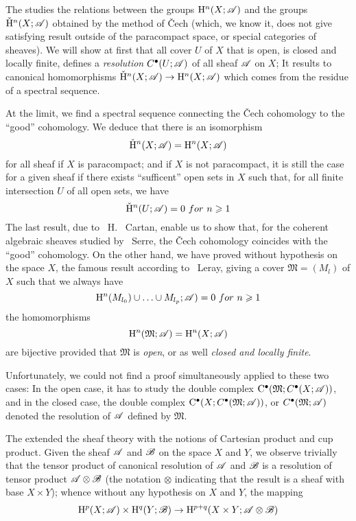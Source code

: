 The  studies the relations between the groups $\mathrm{H}^n(X;\mathscr{A})$ and the groups $\check{\mathrm{H}}^n(X;\mathscr{A})$ obtained by the method of \v{C}ech 
(which, we know it, does not give satisfying result outside of the paracompact space, or special categories of sheaves). 
We will show at first that all cover $U$ of $X$ that is open, is closed and locally finite, defines a \emph{resolution} ${C}^{\bullet}(U;\mathscr{A})$ of all sheaf $\mathscr{A}$ on $X$; 
It results to canonical homomorphisms $\check{\mathrm{H}}^n(X;\mathscr{A}) \rightarrow \mathrm{H}^n(X;\mathscr{A})$ which comes from the residue of a spectral sequence. 

At the limit, we find a spectral sequence connecting the \v{C}ech cohomology to the ``good'' cohomology. 
We deduce that there is an isomorphism
\[
    \check{\mathrm{H}}^n(X;\mathscr{A}) = \mathrm{H}^n(X;\mathscr{A})
\]
for all sheaf if $X$ is paracompact; 
and if $X$ is not paracompact, it is still the case for a given sheaf if there exists ``sufficent'' open sets in $X$ such that, for all finite intersection $U$ of all open sets, we have
\[
    \check{\mathrm{H}}^n(U;\mathscr{A}) = 0 \ for\ n\geqslant 1
\]
The last result, due to ~H. ~Cartan, enable us to show that, for the coherent algebraic sheaves studied by ~Serre, the \v{C}ech cohomology coincides with the ``good'' cohomology.
On the other hand, we have proved without hypothesis on the space $X$, the famous result according to ~Leray, giving a cover $\mathfrak{M} = (M_l)$ of $X$ such that we always have 
\[
    \mathrm{H}^n(M_{l_0})\cup \ldots \cup M_{l_p};\mathscr{A}) = 0\ for\ n\geqslant 1
\]
the homomorphisms
\[
    \mathrm{H}^n(\mathfrak{M};\mathscr{A}) = \mathrm{H}^n(X;\mathscr{A})
\]
are bijective provided that $\mathfrak{M}$ is \emph{open}, or as well \emph{closed and locally finite}. 

Unfortunately, we could not find a proof simultaneously applied to these two cases: 
In the open case, it has to study the double complex ${\mathrm{C}}^{\bullet}(\mathfrak{M}; {C}^{\bullet}(X;\mathscr{A}))$, 
and in the closed case, the double complex ${\mathrm{C}}^{\bullet}(X; {C}^{\bullet}(\mathfrak{M};\mathscr{A}))$, or ${C}^{\bullet}(\mathfrak{M}; \mathscr{A})$ denoted the resolution of $\mathscr{A}$ defined by $\mathfrak{M}$.

The  extended the sheaf theory with the notions of Cartesian product and cup product.
Given the sheaf $\mathscr{A}$ and $\mathscr{B}$ on the space $X$ and $Y$, 
we observe trivially that the tensor product of canonical resolution of $\mathscr{A}$ and $\mathscr{B}$ is a resolution of tensor product $\mathscr{A}\otimes\mathscr{B}$ 
(the notation $\otimes$ indicating that the result is a sheaf with base $X\times Y$); 
whence without any hypothesis on $X$ and $Y$, the mapping 
\[
    \mathrm{H}^p(X;\mathscr{A})\times \mathrm{H}^q(Y;\mathscr{B})\rightarrow \mathrm{H}^{p+q}(X\times Y; \mathscr{A}\otimes \mathscr{B})
\]

